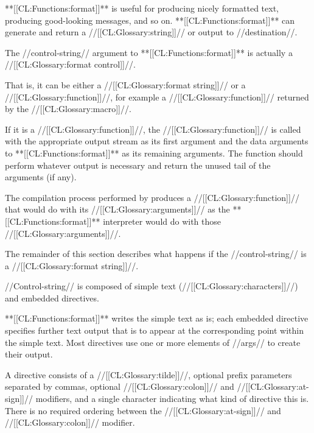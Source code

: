 

 

**[[CL:Functions:format]]** is useful for producing nicely formatted text, producing good-looking messages, and so on.  **[[CL:Functions:format]]** can generate and return a //[[CL:Glossary:string]]// or output to //destination//.

The //control-string// argument to **[[CL:Functions:format]]** is actually a //[[CL:Glossary:format control]]//.

That is, it can be either a //[[CL:Glossary:format string]]// or a //[[CL:Glossary:function]]//, for example a //[[CL:Glossary:function]]// returned by the  //[[CL:Glossary:macro]]//.

If it is a //[[CL:Glossary:function]]//, the //[[CL:Glossary:function]]// is called with the appropriate output stream as its first argument and the data arguments to **[[CL:Functions:format]]** as its remaining arguments.  The function should perform whatever output is  necessary and return the unused tail of the arguments (if any).

The compilation process performed by  produces a //[[CL:Glossary:function]]// that would do with its //[[CL:Glossary:arguments]]// as the **[[CL:Functions:format]]** interpreter would do with those //[[CL:Glossary:arguments]]//.

The remainder of this section describes what happens if the //control-string// is a //[[CL:Glossary:format string]]//.  

//Control-string// is composed of simple text (//[[CL:Glossary:characters]]//)  and embedded directives.

**[[CL:Functions:format]]** writes the simple text as is; each embedded directive specifies further text output  that is to appear at the corresponding point within the simple text.   Most directives use one or more elements of //args// to create their output.

A directive consists of a //[[CL:Glossary:tilde]]//, optional prefix parameters separated by commas, optional //[[CL:Glossary:colon]]// and //[[CL:Glossary:at-sign]]// modifiers, and a single character indicating what kind of directive this is.  There is no required ordering between the //[[CL:Glossary:at-sign]]// and //[[CL:Glossary:colon]]// modifier.

